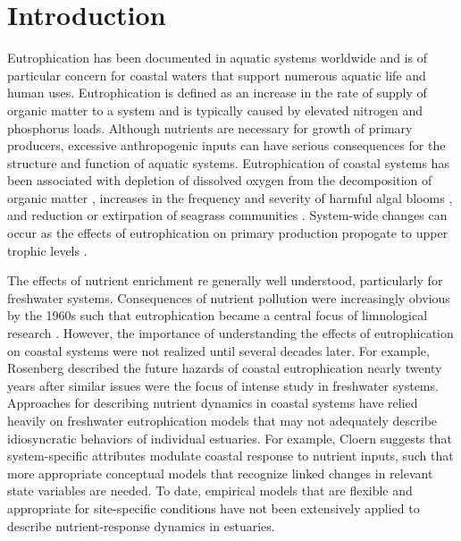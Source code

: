 \documentclass{svjour3}\usepackage[]{graphicx}\usepackage[]{color}
\begin{document}
\acresetall
\section{Introduction} \label{intro}

Eutrophication has been documented in aquatic systems worldwide and is of particular concern for coastal waters that support numerous aquatic life and human uses.  Eutrophication is defined as an increase in the rate of supply of organic matter to a system \cite{Nixon95} and is typically caused by elevated nitrogen and phosphorus loads.  Although nutrients are necessary for growth of primary producers, excessive anthropogenic inputs can have serious consequences for the structure and function of aquatic systems.  Eutrophication of coastal systems has been associated with depletion of dissolved oxygen from the decomposition of organic matter \cite{Diaz08}, increases in the frequency and severity of harmful algal blooms \cite{Glibert13}, and reduction or extirpation of seagrass communities \cite{Duarte95,Tomasko05}.  System-wide changes can occur as the effects of eutrophication on primary production propogate to upper trophic levels \cite{Powers05}. 

The effects of nutrient enrichment re generally well understood, particularly for freshwater systems. Consequences of nutrient pollution were increasingly obvious by the 1960s such that eutrophication became a central focus of limnological research \cite{Cloern01}.  However, the importance of understanding the effects of eutrophication on coastal systems were not realized until several decades later.  For example, Rosenberg \cite{Rosenberg85} described the future hazards of coastal eutrophication nearly twenty years after similar issues were the focus of intense study in freshwater systems.  Approaches for describing nutrient dynamics in coastal systems have relied heavily on freshwater eutrophication models that may not adequately describe idiosyncratic behaviors of individual estuaries.  For example, Cloern \cite{Cloern01} suggests that system-specific attributes modulate coastal response to nutrient inputs, such that more appropriate conceptual models that recognize linked changes in relevant state variables are needed.  To date, empirical models that are flexible and appropriate for site-specific conditions have not been extensively applied to describe nutrient-response dynamics in estuaries.
\end{document}
